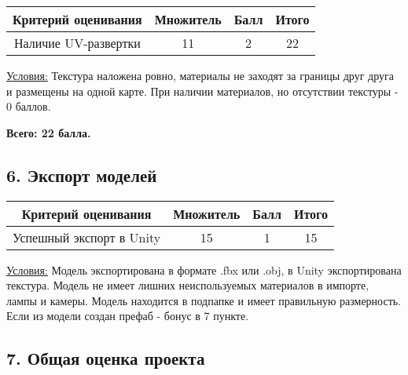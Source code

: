 

\begin{table}[H]
    \begin{center}
        \begin{tabular}{|c|c|c|c|}
            \hline
            Критерий оценивания &	Множитель &	Балл &	Итого \\
            \hline
            Наличие UV-развертки &	11 &	2	& 22 \\       
            \hline
        \end{tabular} 
    \end {center} 
\end{table} 

\underline{Условия:} Текстура наложена ровно, материалы не заходят за границы друг друга и размещены на одной карте. При наличии материалов, но отсутствии текстуры - 0 баллов.

\textbf{Всего: 22 балла.}

\subsection*{6. Экспорт моделей}





\begin{table}[H]
    \begin{center}
        \begin{tabular}{|c|c|c|c|}
            \hline
            Критерий оценивания &	Множитель &	Балл &	Итого \\
            \hline
            Успешный экспорт в Unity & 15 & 1 &	15 \\      
            \hline
        \end{tabular} 
    \end {center} 
\end{table} 

\underline{Условия:} Модель экспортирована в формате .fbx или .obj, в Unity экспортирована текстура. Модель не имеет лишних неиспользуемых материалов в импорте, лампы и камеры. Модель находится в подпапке и имеет правильную размерность. Если из модели создан префаб - бонус в 7 пункте.

\subsection*{7. Общая оценка проекта}


